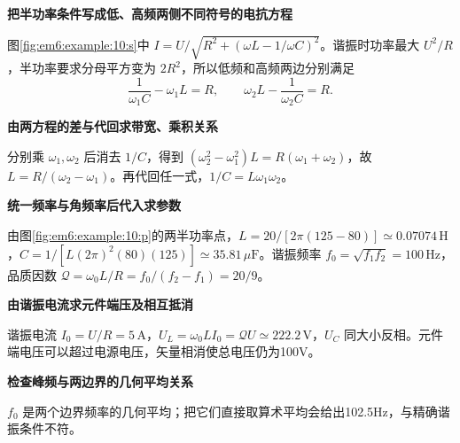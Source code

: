 \begin{solution}\textbf{把半功率条件写成低、高频两侧不同符号的电抗方程}\par\nobreak
图\ref{fig:em6:example:10:s}中 $I=U/\sqrt{R^2+(\omega L-1/\omega C)^2}$。谐振时功率最大 $U^2/R$，半功率要求分母平方变为 $2R^2$，所以低频和高频两边分别满足
\[\frac1{\omega_1C}-\omega_1L=R,\qquad \omega_2L-\frac1{\omega_2C}=R.\]


\par\medskip{}\noindent\textbf{由两方程的差与代回求带宽、乘积关系}\par\nobreak
分别乘 $\omega_1,\omega_2$ 后消去 $1/C$，得到 $(\omega_2^2-\omega_1^2)L=R(\omega_1+\omega_2)$，故 $L=R/(\omega_2-\omega_1)$。再代回任一式，$1/C=L\omega_1\omega_2$。



\par\medskip{}\noindent\textbf{统一频率与角频率后代入求参数}\par\nobreak
由图\ref{fig:em6:example:10:p}的两半功率点，$L=20/[2\pi(125-80)]\simeq0.07074\,\mathrm H$，$C=1/[L(2\pi)^2(80)(125)]\simeq35.81\,\mu\mathrm F$。谐振频率 $f_0=\sqrt{f_1f_2}=100\,\mathrm{Hz}$，品质因数 $\mathcal Q=\omega_0L/R=f_0/(f_2-f_1)=20/9$。



\par\medskip{}\noindent\textbf{由谐振电流求元件端压及相互抵消}\par\nobreak
谐振电流 $I_0=U/R=5\,\mathrm A$，$U_L=\omega_0LI_0=\mathcal QU\simeq222.2\,\mathrm V$，$U_C$ 同大小反相。元件端电压可以超过电源电压，矢量相消使总电压仍为100V。

\par\medskip{}\noindent\textbf{检查峰频与两边界的几何平均关系}\par\nobreak
$f_0$ 是两个边界频率的几何平均；把它们直接取算术平均会给出102.5Hz，与精确谐振条件不符。\end{solution}
